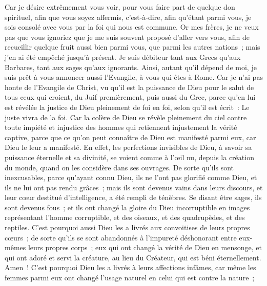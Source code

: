 \begin{multicols}{2}
Car je désire extrêmement vous voir, pour vous faire part de quelque don spirituel, afin que vous soyez affermis,
c'est-à-dire, afin qu'étant parmi vous, je sois consolé avec vous par la foi qui nous est commune.
Or mes frères, je ne veux pas que vous ignoriez que je me suis souvent proposé d'aller vers vous, afin de recueillir quelque fruit aussi bien parmi vous, que parmi les autres nations~; mais j'en ai été empêché jusqu'à présent.
Je suis débiteur tant aux Grecs qu'aux Barbares, tant aux sages qu'aux ignorants.
Ainsi, autant qu'il dépend de moi, je suis prêt à vous annoncer aussi l'Evangile, à vous qui êtes à Rome.
Car je n'ai pas honte de l'Evangile de Christ, vu qu'il est la puissance de Dieu pour le salut de tous ceux qui croient, du Juif premièrement, puis aussi du Grec,
parce qu'en lui est révélée la justice de Dieu pleinement de foi en foi, selon qu'il est écrit~: Le juste vivra de la foi.
Car la colère de Dieu se révèle pleinement du ciel contre toute impiété et injustice des hommes qui retiennent injustement la vérité captive,
parce que ce qu'on peut connaître de Dieu est manifesté parmi eux, car Dieu le leur a manifesté.
En effet, les perfections invisibles de Dieu, à savoir sa puissance éternelle et sa divinité, se voient comme à l'œil nu, depuis la création du monde, quand on les considère dans ses ouvrages. De sorte qu'ils sont inexcusables,
parce qu'ayant connu Dieu, ils ne l'ont pas glorifié comme Dieu, et ils ne lui ont pas rendu grâces~; mais ils sont devenus vains dans leurs discours, et leur cœur destitué d'intelligence, a été rempli de ténèbres.
Se disant être sages, ils sont devenus fous~;
et ils ont changé la gloire du Dieu incorruptible en images représentant l'homme corruptible, et des oiseaux, et des quadrupèdes, et des reptiles.
C'est pourquoi aussi Dieu les a livrés aux convoitises de leurs propres cœurs~; de sorte qu'ils se sont abandonnés à l'impureté déshonorant entre eux-mêmes leurs propres corps~;
eux qui ont changé la vérité de Dieu en mensonge, et qui ont adoré et servi la créature, au lieu du Créateur, qui est béni éternellement. Amen~!
C'est pourquoi Dieu les a livrés à leurs affections infâmes, car même les femmes parmi eux ont changé l'usage naturel en celui qui est contre la nature~;

\end{multicols}
